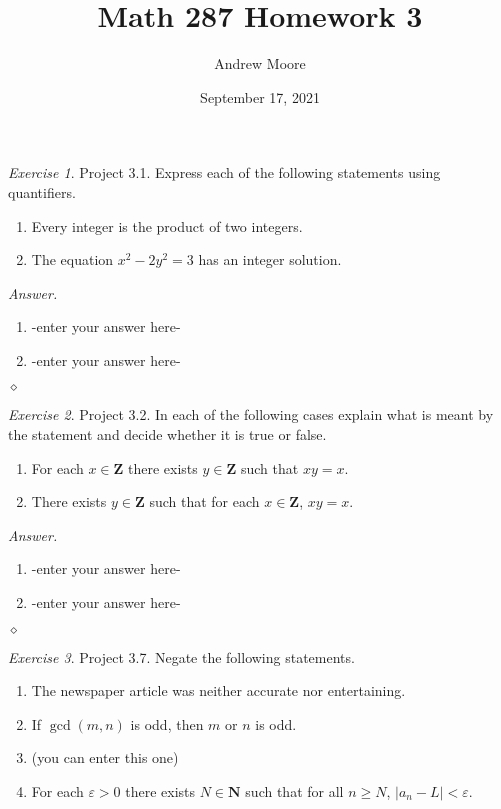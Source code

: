 \documentclass[12pt,oneside]{amsart}
\title{Math 287 Homework 3}
\author{Andrew Moore}
\date{September 17, 2021} %
\theoremstyle{remark}
\newtheorem{exer}{Exercise}
\newenvironment{answer}{\bigskip\noindent\emph{Answer.}}{\hfill$\diamond$\newline}
\begin{document}
\maketitle

\newpage
\begin{exer}
Project 3.1. Express each of the following statements using quantifiers.
\begin{enumerate}[label={(\roman*)},start={3}]
\item Every integer is the product of two integers.
\item The equation $x^2-2y^2 = 3$ has an integer solution.
\end{enumerate}
\end{exer}

\begin{answer}
\begin{enumerate}[label={(\roman*)},start={3}]
\item -enter your answer here-
\item -enter your answer here-
\end{enumerate}
\end{answer}

\newpage
\begin{exer}
Project 3.2. In each of the following cases explain what is meant by the statement
and decide whether it is true or false.
\begin{enumerate}[label={(\roman*)},start={3}]
\item For each $x \in \mathbf{Z}$ there exists $y \in \mathbf{Z}$ such that $xy=x$.
\item There exists $y \in \mathbf{Z}$ such that for each $x \in \mathbf{Z}$, $xy=x$.
\end{enumerate}
\end{exer}

\begin{answer}
\begin{enumerate}[label={(\roman*)},start={3}]
\item -enter your answer here-
\item -enter your answer here-
\end{enumerate}
\end{answer}

\newpage
\begin{exer}
Project 3.7. Negate the following statements.
\begin{enumerate}[label={(\roman*)},start={4}]
\item The newspaper article was neither accurate nor entertaining.
\item If $\gcd(m,n)$ is odd, then $m$ or $n$ is odd.
\item (you can enter this one)
\item For each $\varepsilon > 0$ there exists $N \in \mathbf{N}$ such that
for all $n \geq N$, $|a_n-L| < \varepsilon$.
\end{enumerate}
\end{exer}
\end{document}
